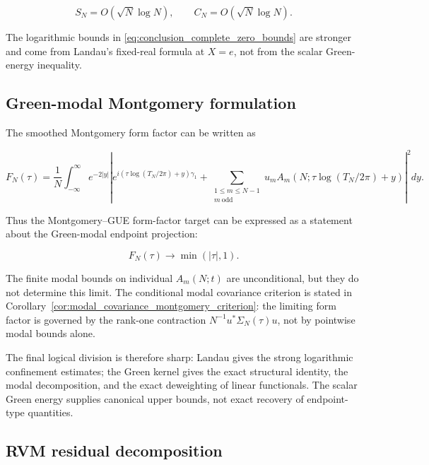 \documentclass[11pt]{amsart}
\numberwithin{equation}{section}
\theoremstyle{plain}
\theoremstyle{definition}
\theoremstyle{remark}
\begin{document}
\begin{equation}
S_N=O(\sqrt N\log N),
\qquad
C_N=O(\sqrt N\log N).
\label{eq:conclusion_weak_green_bounds_at_t_one}
\end{equation}

The logarithmic bounds in \eqref{eq:conclusion_complete_zero_bounds} are
stronger and come from Landau's fixed-real formula at \(X=e\), not from
the scalar Green-energy inequality.

\subsection{Green-modal Montgomery formulation}
\label{subsec:conclusion_green_modal_montgomery}
\leavevmode\par\nobreak

The smoothed Montgomery form factor can be written as

\begin{equation}
F_N(\tau)
=
\frac1N
\int_{-\infty}^{\infty}
e^{-2|y|}
\left|
e^{i(\tau\log(T_N/2\pi)+y)\gamma_1}
+
\sum_{\substack{1\le m\le N-1\\ m\ \mathrm{odd}}}
u_mA_m(N;\tau\log(T_N/2\pi)+y)
\right|^2dy.
\label{eq:conclusion_green_modal_montgomery}
\end{equation}

Thus the Montgomery--GUE form-factor target can be expressed as a
statement about the Green-modal endpoint projection:

\begin{equation}
F_N(\tau)\to\min(|\tau|,1).
\label{eq:conclusion_montgomery_target}
\end{equation}

The finite modal bounds on individual \(A_m(N;t)\) are unconditional, but
they do not determine this limit. The conditional modal covariance
criterion is stated in
Corollary~\ref{cor:modal_covariance_montgomery_criterion}: the limiting
form factor is governed by the rank-one contraction
\(N^{-1}u^*\Sigma_N(\tau)u\), not by pointwise modal bounds alone.

The final logical division is therefore sharp: Landau gives the strong
logarithmic confinement estimates; the Green kernel gives the exact
structural identity, the modal decomposition, and the exact deweighting
of linear functionals. The scalar Green energy supplies canonical upper
bounds, not exact recovery of endpoint-type quantities.

\subsection{RVM residual decomposition}
\label{subsec:conclusion_rvm_residual_decomposition}
\leavevmode\par\nobreak
\end{document}
